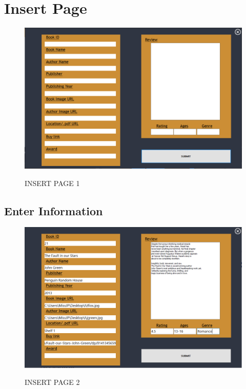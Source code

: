 \section{Insert Page}
\begin{figure}[H]
\centering
\caption{INSERT PAGE 1}
\includegraphics[scale=.5]{./ssinsert1.png}
\\[0.2in]
\label{fig:insert}
\end{figure}
\thispagestyle{fancy}
\subsection{Enter Information}
\begin{figure}[H]
\centering
\caption{INSERT PAGE 2}
\includegraphics[scale=.5]{./ssinsert2.png}
\\[0.2in]
\label{fig:enter info}
\end{figure}
\thispagestyle{fancy}

